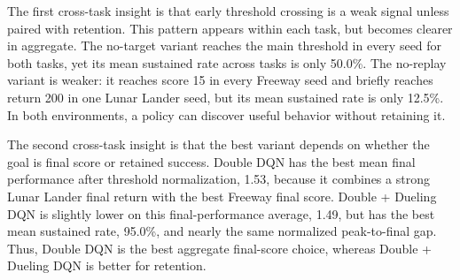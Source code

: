 \documentclass[12pt]{article}
\begin{document}



The first cross-task insight is that early threshold crossing is a weak signal unless paired with retention. This pattern appears within each task, but becomes clearer in aggregate. The no-target variant reaches the main threshold in every seed for both tasks, yet its mean sustained rate across tasks is only 50.0\%. The no-replay variant is weaker: it reaches score 15 in every Freeway seed and briefly reaches return 200 in one Lunar Lander seed, but its mean sustained rate is only 12.5\%. In both environments, a policy can discover useful behavior without retaining it.

The second cross-task insight is that the best variant depends on whether the goal is final score or retained success. Double DQN has the best mean final performance after threshold normalization, 1.53, because it combines a strong Lunar Lander final return with the best Freeway final score. Double + Dueling DQN is slightly lower on this final-performance average, 1.49, but has the best mean sustained rate, 95.0\%, and nearly the same normalized peak-to-final gap. Thus, Double DQN is the best aggregate final-score choice, whereas Double + Dueling DQN is better for retention.
\end{document}
